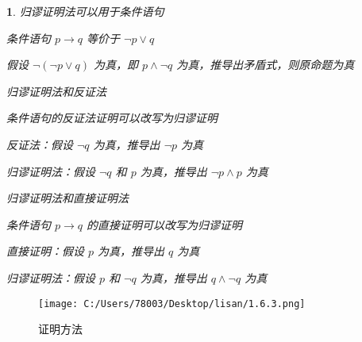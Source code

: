 \documentclass[UTF8]{report}
\theoremstyle{MyLineTheoremStyle} %
\theoremstyle{MyBlockTheoremStyle} %
\theoremstyle{MySubsubsectionStyle} %
\newtheorem{definition}{}
\begin{document}
\begin{definition}
    归谬证明法可以用于条件语句\par
    条件语句 $p \rightarrow q$ 等价于 $\neg p \lor q$\par
    假设 $\neg (\neg p \lor q)$ 为真，即 $p \land \neg q$ 为真，推导出矛盾式，则原命题为真\par
\vspace{1em}
    归谬证明法和反证法\par
    条件语句的反证法证明可以改写为归谬证明\par
    反证法：假设 $\neg q$ 为真，推导出 $\neg p$ 为真\par
    归谬证明法：假设 $\neg q$ 和 $p$ 为真，推导出 $\neg p \land p$ 为真\par
\vspace{1em}
    归谬证明法和直接证明法\par
    条件语句 $p \rightarrow q$ 的直接证明可以改写为归谬证明\par
    直接证明：假设 $p$ 为真，推导出 $q$ 为真\par
    归谬证明法：假设 $p$ 和 $\neg q$ 为真，推导出 $q \land \neg q$ 为真\par
\end{definition}

\begin{figure}[ht]
\centering
\texttt{[image: C:/Users/78003/Desktop/lisan/1.6.3.png]}
\caption{证明方法}
\end{figure}
\end{document}
